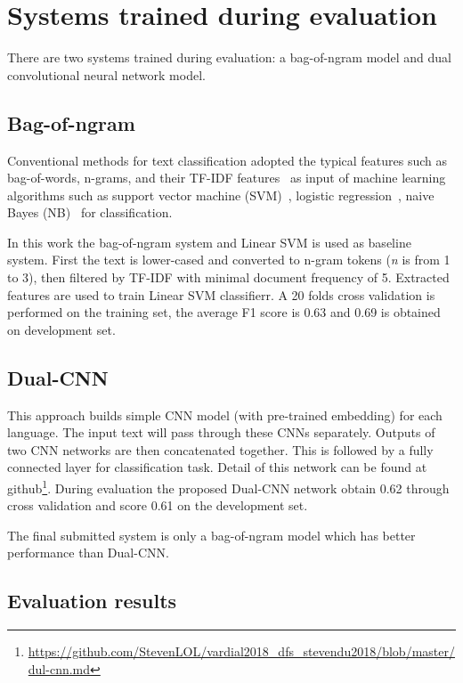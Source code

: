 \documentclass[11pt]{article}
\begin{document}
\section{Systems trained during evaluation}

There are two systems trained during evaluation: a bag-of-ngram model and dual convolutional neural network model. 

\subsection{Bag-of-ngram}

Conventional methods for text classification adopted the typical features such as bag-of-words, n-grams, and their TF-IDF features~\cite{4811259} as input of machine learning algorithms such as support vector machine (SVM)~\cite{10.1007/BFb0026683}, logistic regression~\cite{004017007000000245}, naive Bayes (NB)~\cite{Mccallum1998A} for classification.

In this work the bag-of-ngram system and Linear SVM is used as baseline system. First the text is lower-cased and converted to n-gram tokens (\textit{n} is from 1 to 3), then filtered by TF-IDF with minimal document frequency of 5. Extracted features are used to train Linear SVM classifierr. A 20 folds cross validation is performed on the training set, the average F1 score is 0.63 and 0.69 is obtained on development set. 



\subsection{Dual-CNN}
\label{sect:pdf}

This approach builds simple CNN model (with pre-trained embedding) for each language. The input text will pass through these CNNs separately. Outputs of two CNN networks are then concatenated together. This is followed by a fully connected layer for classification task. Detail of this network can be found at github\footnote{\url{https://github.com/StevenLOL/vardial2018_dfs_stevendu2018/blob/master/dul-cnn.md}}. During evaluation the proposed Dual-CNN network obtain 0.62 through cross validation and score 0.61 on the development set.

The final submitted system is only a bag-of-ngram model which has better performance than Dual-CNN.


\subsection{Evaluation results}
\end{document}
